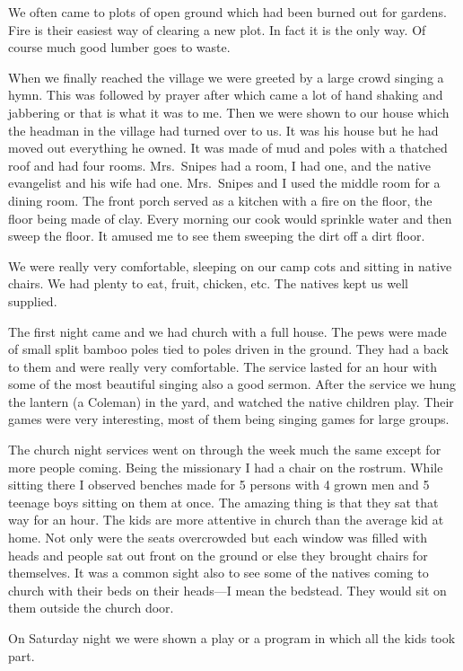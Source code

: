 \documentclass[
]{book}
\begin{document}
We often came to plots of open ground which had been burned out for gardens. Fire is their easiest way of clearing a new plot. In fact it is the only way. Of course much good lumber goes to waste.

When we finally reached the village we were greeted by a large crowd singing a hymn. This was followed by prayer after which came a lot of hand shaking and jabbering or that is what it was to me. Then we were shown to our house which the headman in the village had turned over to us. It was his house but he had moved out everything he owned. It was made of mud and poles with a thatched roof and had four rooms. Mrs.~Snipes had a room, I had one, and the native evangelist and his wife had one. Mrs.~Snipes and I used the middle room for a dining room. The front porch served as a kitchen with a fire on the floor, the floor being made of clay. Every morning our cook would sprinkle water and then sweep the floor. It amused me to see them sweeping the dirt off a dirt floor.

We were really very comfortable, sleeping on our camp cots and sitting in native chairs. We had plenty to eat, fruit, chicken, etc. The natives kept us well supplied.

The first night came and we had church with a full house. The pews were made of small split bamboo poles tied to poles driven in the ground. They had a back to them and were really very comfortable. The service lasted for an hour with some of the most beautiful singing also a good sermon. After the service we hung the lantern (a Coleman) in the yard, and watched the native children play. Their games were very interesting, most of them being singing games for large groups.

The church night services went on through the week much the same except for more people coming. Being the missionary I had a chair on the rostrum. While sitting there I observed benches made for 5 persons with 4 grown men and 5 teenage boys sitting on them at once. The amazing thing is that they sat that way for an hour. The kids are more attentive in church than the average kid at home. Not only were the seats overcrowded but each window was filled with heads and people sat out front on the ground or else they brought chairs for themselves. It was a common sight also to see some of the natives coming to church with their beds on their heads---I mean the bedstead. They would sit on them outside the church door.

On Saturday night we were shown a play or a program in which all the kids took part.
\end{document}
